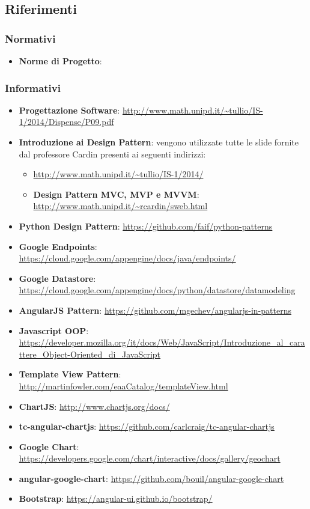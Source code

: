 	\subsection{Riferimenti} %
	\label{sub:riferimenti}
		\subsubsection{Normativi} %
		\label{ssub:normativi}
			\begin{itemize}
				\item \textbf{Norme di Progetto}: \docNameVersionNdP
			\end{itemize}

		\subsubsection{Informativi} %
		\label{ssub:informativi}
			\begin{itemize}
				\item \textbf{Progettazione Software}: \url{http://www.math.unipd.it/~tullio/IS-1/2014/Dispense/P09.pdf}
				\item \textbf{Introduzione ai Design Pattern}: vengono utilizzate tutte le slide fornite dal professore Cardin presenti ai seguenti indirizzi:
					\begin{itemize}
						\item \url{http://www.math.unipd.it/~tullio/IS-1/2014/}
						\item \textbf{Design Pattern MVC, MVP e MVVM}: \url{http://www.math.unipd.it/~rcardin/sweb.html}
					\end{itemize}
				\item \textbf{Python Design Pattern}: \url{https://github.com/faif/python-patterns}
				\item \textbf{Google Endpoints}: \url{https://cloud.google.com/appengine/docs/java/endpoints/}
				\item \textbf{Google Datastore}: \url{https://cloud.google.com/appengine/docs/python/datastore/datamodeling}
				\item \textbf{AngularJS Pattern}: \url{https://github.com/mgechev/angularjs-in-patterns}
				\item \textbf{Javascript OOP}: \url{https://developer.mozilla.org/it/docs/Web/JavaScript/Introduzione_al_carattere_Object-Oriented_di_JavaScript}
				\item \textbf{Template View Pattern}: \url{http://martinfowler.com/eaaCatalog/templateView.html}
				\item \textbf{ChartJS}: \url{http://www.chartjs.org/docs/}
				\item \textbf{tc-angular-chartjs}: \url{https://github.com/carlcraig/tc-angular-chartjs}
				\item \textbf{Google Chart}: \url{https://developers.google.com/chart/interactive/docs/gallery/geochart}
				\item \textbf{angular-google-chart}: \url{https://github.com/bouil/angular-google-chart}
				\item \textbf{Bootstrap}: \url{https://angular-ui.github.io/bootstrap/}
			\end{itemize}
